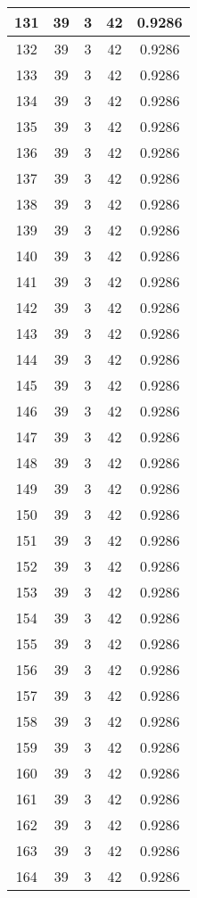 \documentclass[letterpaper, 12pt]{article}
\begin{document}
\begin{longtable}{|c|c|c|c|c|}
\hline
131 & 39 & 3 & 42 & 0.9286 \\
\hline
132 & 39 & 3 & 42 & 0.9286 \\
\hline
133 & 39 & 3 & 42 & 0.9286 \\
\hline
134 & 39 & 3 & 42 & 0.9286 \\
\hline
135 & 39 & 3 & 42 & 0.9286 \\
\hline
136 & 39 & 3 & 42 & 0.9286 \\
\hline
137 & 39 & 3 & 42 & 0.9286 \\
\hline
138 & 39 & 3 & 42 & 0.9286 \\
\hline
139 & 39 & 3 & 42 & 0.9286 \\
\hline
140 & 39 & 3 & 42 & 0.9286 \\
\hline
141 & 39 & 3 & 42 & 0.9286 \\
\hline
142 & 39 & 3 & 42 & 0.9286 \\
\hline
143 & 39 & 3 & 42 & 0.9286 \\
\hline
144 & 39 & 3 & 42 & 0.9286 \\
\hline
145 & 39 & 3 & 42 & 0.9286 \\
\hline
146 & 39 & 3 & 42 & 0.9286 \\
\hline
147 & 39 & 3 & 42 & 0.9286 \\
\hline
148 & 39 & 3 & 42 & 0.9286 \\
\hline
149 & 39 & 3 & 42 & 0.9286 \\
\hline
150 & 39 & 3 & 42 & 0.9286 \\
\hline
151 & 39 & 3 & 42 & 0.9286 \\
\hline
152 & 39 & 3 & 42 & 0.9286 \\
\hline
153 & 39 & 3 & 42 & 0.9286 \\
\hline
154 & 39 & 3 & 42 & 0.9286 \\
\hline
155 & 39 & 3 & 42 & 0.9286 \\
\hline
156 & 39 & 3 & 42 & 0.9286 \\
\hline
157 & 39 & 3 & 42 & 0.9286 \\
\hline
158 & 39 & 3 & 42 & 0.9286 \\
\hline
159 & 39 & 3 & 42 & 0.9286 \\
\hline
160 & 39 & 3 & 42 & 0.9286 \\
\hline
161 & 39 & 3 & 42 & 0.9286 \\
\hline
162 & 39 & 3 & 42 & 0.9286 \\
\hline
163 & 39 & 3 & 42 & 0.9286 \\
\hline
164 & 39 & 3 & 42 & 0.9286 \\

\end{longtable}
\end{document}
